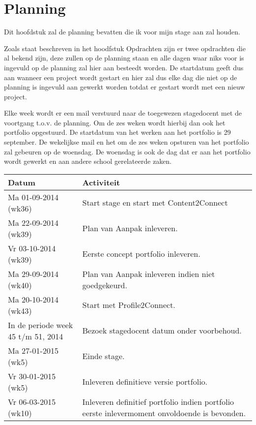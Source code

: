 \section{Planning}
Dit hoofdstuk zal de planning bevatten die ik voor mijn stage aan zal houden.

Zoals staat beschreven in het hoodfstuk Opdrachten zijn er twee opdrachten die al bekend zijn, deze zullen op de planning staan en alle dagen waar niks voor is ingevuld op de planning zal hier aan besteedt worden. De startdatum geeft dus aan wanneer een project wordt gestart en hier zal dus elke dag die niet op de planning is ingevuld aan gewerkt worden totdat er gestart wordt met een nieuw project.

Elke week wordt er een mail verstuurd naar de toegewezen stagedocent met de voortgang t.o.v. de planning. Om de zes weken wordt hierbij dan ook het portfolio opgestuurd. De startdatum van het werken aan het portfolio is 29 september. De wekelijkse mail en het om de zes weken opsturen van het portfolio zal gebeuren op de woensdag. De woensdag is ook de dag dat er aan het portfolio wordt gewerkt en aan andere school gerelateerde zaken.
\begin{tabu} to \textwidth { | X[l] | X[l] | }
\hline
Datum & Activiteit \\ 
\hline
Ma 01-09-2014 (wk36) & Start stage en start met Content2Connect \\
\hline
Ma 22-09-2014 (wk39) & Plan van Aanpak inleveren. \\
\hline
Vr 03-10-2014 (wk39) & Eerste concept portfolio inleveren. \\
\hline
Ma 29-09-2014 (wk40) & Plan van Aanpak inleveren indien niet goedgekeurd. \\
\hline
Ma 20-10-2014 (wk43) & Start met Profile2Connect. \\
\hline
In de periode week 45 t/m 51, 2014 & Bezoek stagedocent datum onder voorbehoud. \\
\hline
Ma 27-01-2015 (wk5) & Einde stage. \\
\hline
Vr 30-01-2015 (wk5) & Inleveren definitieve versie portfolio. \\
\hline
Vr 06-03-2015 (wk10) & Inleveren definitief portfolio indien portfolio eerste inlevermoment onvoldoende is bevonden. \\
\hline
\end{tabu}


